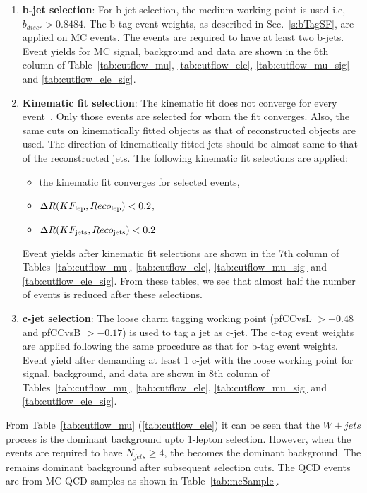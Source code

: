 \begin{enumerate}
\item {\bf{b-jet selection}}:
For b-jet selection, the medium working point is used i.e, $b_{discr} > 0.8484$. 
The b-tag event weights, as described in Sec.~\ref{s:bTagSF}, are applied on
MC events. The events are required to have at least two b-jets.
Event yields for MC signal, background and data are shown in the 6th column of Table~\ref{tab:cutflow_mu},
\ref{tab:cutflow_ele}, \ref{tab:cutflow_mu_sig} and \ref{tab:cutflow_ele_sig}.

\item {\bf{Kinematic fit selection}}:
The kinematic fit does not converge for every event~\cite{DHondt:2006iej}.
Only those events are selected for whom the fit converges.
Also, the same cuts on kinematically fitted objects as that of reconstructed objects are used.
The direction of kinematically fitted jets should be almost same to that of the reconstructed jets.
The following kinematic fit selections are applied: 
\begin{itemize}
 \item the kinematic fit converges for selected events,
 \item $\Delta R (KF_{\rm lep}, Reco_{\rm lep}) < 0.2$,
 \item $\Delta R (KF_{\rm jets}, Reco_{\rm jets}) < 0.2$%
\end{itemize}
Event yields after kinematic fit selections are shown in the 7th column of Tables~\ref{tab:cutflow_mu},
\ref{tab:cutflow_ele}, \ref{tab:cutflow_mu_sig} and \ref{tab:cutflow_ele_sig}.
From these tables, we see that almost half the number of events is reduced after these selections.

\item {\bf{c-jet selection}}:
The loose charm tagging working point (pfCCvsL $> -0.48$ and pfCCvsB $> -0.17$) is used to tag a jet as c-jet.
The c-tag event weights are applied following the same procedure as that for b-tag event weights.
Event yield after demanding at least 1 c-jet with the loose working point for signal, background, and data are shown in 8th column of
Tables~\ref{tab:cutflow_mu}, \ref{tab:cutflow_ele}, \ref{tab:cutflow_mu_sig} and \ref{tab:cutflow_ele_sig}.

\end{enumerate}

From Table~\ref{tab:cutflow_mu} (\ref{tab:cutflow_ele}) it can be seen that the $W + jets$ 
process is the dominant background upto 1-lepton selection. However, when the events are required to have $N_{jets} \geq 4$, the \ttjets 
becomes the dominant background. The \ttjets remains dominant background after
subsequent selection cuts. The QCD events are from MC QCD samples as shown in 
Table~\ref{tab:mcSample}.

